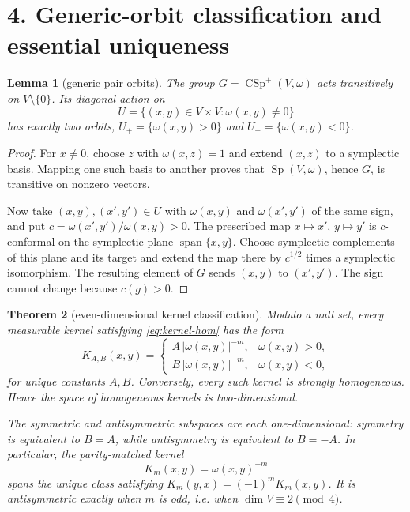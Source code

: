 \documentclass[11pt]{article}
\newtheorem{theorem}{Theorem}
\newtheorem{lemma}[theorem]{Lemma}
\newcommand{\Sp}{\operatorname{Sp}}
\newcommand{\CSp}{\operatorname{CSp}^{+}}
\begin{document}
\section*{4. Generic-orbit classification and essential uniqueness}

\begin{lemma}[generic pair orbits]\label{lem:orbits}
The group $G=\CSp(V,\omega)$ acts transitively on $V\setminus\{0\}$.  Its diagonal action on
\[
 U=\{(x,y)\in V\times V:\omega(x,y)\ne0\}
\]
has exactly two orbits,
$U_+=\{\omega(x,y)>0\}$ and $U_-=\{\omega(x,y)<0\}$.
\end{lemma}

\begin{proof}
For $x\ne0$, choose $z$ with $\omega(x,z)=1$ and extend $(x,z)$ to a symplectic basis.  Mapping one such basis to another proves that $\Sp(V,\omega)$, hence $G$, is transitive on nonzero vectors.

Now take $(x,y),(x',y')\in U$ with $\omega(x,y)$ and $\omega(x',y')$ of the same sign, and put
$c=\omega(x',y')/\omega(x,y)>0$.  The prescribed map $x\mapsto x'$, $y\mapsto y'$ is $c$-conformal on the symplectic plane $\operatorname{span}\{x,y\}$.  Choose symplectic complements of this plane and its target and extend the map there by $c^{1/2}$ times a symplectic isomorphism.  The resulting element of $G$ sends $(x,y)$ to $(x',y')$.  The sign cannot change because $c(g)>0$.
\end{proof}

\begin{theorem}[even-dimensional kernel classification]\label{thm:classification}
Modulo a null set, every measurable kernel satisfying \eqref{eq:kernel-hom} has the form
\begin{equation}\label{eq:AB}
 K_{A,B}(x,y)=
 \begin{cases}
 A\,|\omega(x,y)|^{-m},&\omega(x,y)>0,\\
 B\,|\omega(x,y)|^{-m},&\omega(x,y)<0,
 \end{cases}
\end{equation}
for unique constants $A,B$.  Conversely, every such kernel is strongly homogeneous.  Hence the space of homogeneous kernels is two-dimensional.

The symmetric and antisymmetric subspaces are each one-dimensional: symmetry is equivalent to $B=A$, while antisymmetry is equivalent to $B=-A$.  In particular, the parity-matched kernel
\begin{equation}\label{eq:Km}
 K_m(x,y)=\omega(x,y)^{-m}
\end{equation}
spans the unique class satisfying
$K_m(y,x)=(-1)^mK_m(x,y)$.  It is antisymmetric exactly when $m$ is odd, i.e. when $\dim V\equiv2\pmod4$.
\end{theorem}
\end{document}
